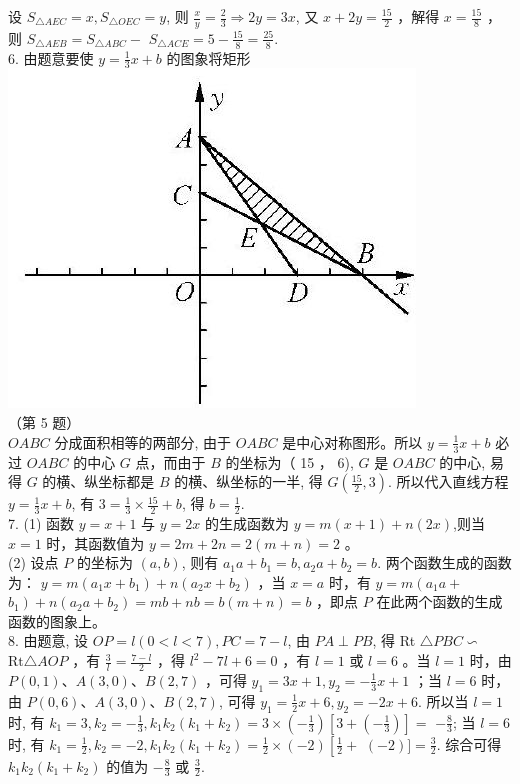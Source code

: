 \documentclass[10pt]{article}
\begin{document}
设 $S_{\triangle A E C}=x, S_{\triangle O E C}=y$, 则 $\frac{x}{y}=\frac{2}{3} \Rightarrow 2 y=3 x$, 又 $x+2 y=\frac{15}{2}$ ，解得 $x=\frac{15}{8}$ ，则 $S_{\triangle A E B}=S_{\triangle A B C}-$ $S_{\triangle A C E}=5-\frac{15}{8}=\frac{25}{8}$.\\
6. 由题意要使 $y=\frac{1}{3} x+b$ 的图象将矩形\\
\includegraphics[max width=\textwidth, center]{2024_10_30_1bf34f7aeb61f11d11d3g-108}\\
（第 5 题）\\
$O A B C$ 分成面积相等的两部分, 由于 $O A B C$ 是中心对称图形。所以 $y=\frac{1}{3} x+b$ 必过 $O A B C$ 的中心 $G$ 点，而由于 $B$ 的坐标为（ 15 ， 6), $G$ 是 $O A B C$ 的中心, 易得 $G$ 的横、纵坐标都是 $B$ 的横、纵坐标的一半, 得 $G\left(\frac{15}{2}, 3\right)$. 所以代入直线方程 $y=\frac{1}{3} x+b$, 有 $3=\frac{1}{3} \times \frac{15}{2}+b$, 得 $b=\frac{1}{2}$.\\
7. (1) 函数 $y=x+1$ 与 $y=2 x$ 的生成函数为 $y=m(x+1)+n(2 x)$,则当 $x=1$ 时，其函数值为 $y=2 m+2 n=2(m+n)=2$ 。\\
(2) 设点 $P$ 的坐标为 $(a, b)$, 则有 $a_{1} a+b_{1}=b, a_{2} a+b_{2}=b$. 两个函数生成的函数为： $y=m\left(a_{1} x+b_{1}\right)+n\left(a_{2} x+b_{2}\right)$ ，当 $x=a$ 时，有 $y=m\left(a_{1} a+\right.$ $\left.b_{1}\right)+n\left(a_{2} a+b_{2}\right)=m b+n b=b(m+n)=b$ ，即点 $P$ 在此两个函数的生成函数的图象上。\\
8. 由题意, 设 $O P=l(0<l<7), P C=7-l$, 由 $P A \perp P B$, 得 Rt $\triangle P B C \backsim$ $\mathrm{Rt} \triangle A O P$ ，有 $\frac{3}{l}=\frac{7-l}{2}$ ，得 $l^{2}-7 l+6=0$ ，有 $l=1$ 或 $l=6$ 。当 $l=1$ 时，由 $P(0,1) 、 A(3,0) 、 B(2,7)$ ，可得 $y_{1}=3 x+1, y_{2}=-\frac{1}{3} x+1$ ；当 $l=6$ 时，由 $P(0,6) 、 A(3,0) 、 B(2,7)$, 可得 $y_{1}=\frac{1}{2} x+6, y_{2}=-2 x+6$. 所以当 $l=1$ 时, 有 $k_{1}=3, k_{2}=-\frac{1}{3}, k_{1} k_{2}\left(k_{1}+k_{2}\right)=3 \times\left(-\frac{1}{3}\right)\left[3+\left(-\frac{1}{3}\right)\right]=$ $-\frac{8}{3}$; 当 $l=6$ 时, 有 $k_{1}=\frac{1}{2}, k_{2}=-2, k_{1} k_{2}\left(k_{1}+k_{2}\right)=\frac{1}{2} \times(-2)\left[\frac{1}{2}+\right.$ $(-2)]=\frac{3}{2}$. 综合可得 $k_{1} k_{2}\left(k_{1}+k_{2}\right)$ 的值为 $-\frac{8}{3}$ 或 $\frac{3}{2}$.\\
\end{document}
